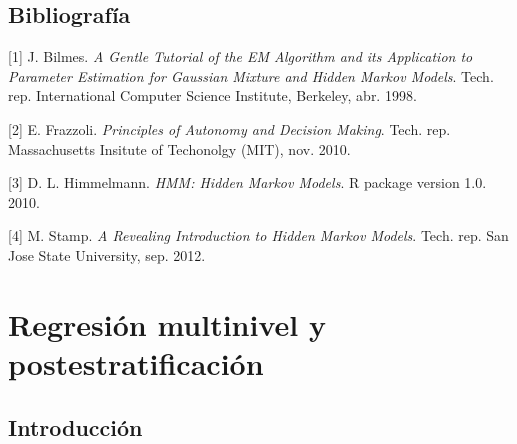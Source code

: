 \documentclass[]{article}
\newenvironment{Shaded}{\begin{snugshade}}{\end{snugshade}}
\newcommand{\KeywordTok}[1]{\textcolor[rgb]{0.13,0.29,0.53}{\textbf{{#1}}}}
\newcommand{\DataTypeTok}[1]{\textcolor[rgb]{0.13,0.29,0.53}{{#1}}}
\newcommand{\DecValTok}[1]{\textcolor[rgb]{0.00,0.00,0.81}{{#1}}}
\newcommand{\StringTok}[1]{\textcolor[rgb]{0.31,0.60,0.02}{{#1}}}
\newcommand{\CommentTok}[1]{\textcolor[rgb]{0.56,0.35,0.01}{\textit{{#1}}}}
\newcommand{\NormalTok}[1]{{#1}}
\begin{document}
\begin{Shaded}
\end{Shaded}

\pagebreak

\subsection{Bibliografía}\label{bibliografia}

{[}1{]} J. Bilmes. \emph{A Gentle Tutorial of the EM Algorithm and its
Application to Parameter Estimation for Gaussian Mixture and Hidden
Markov Models}. Tech. rep. International Computer Science Institute,
Berkeley, abr. 1998.

{[}2{]} E. Frazzoli. \emph{Principles of Autonomy and Decision Making}.
Tech. rep. Massachusetts Insitute of Techonolgy (MIT), nov. 2010.

{[}3{]} D. L. Himmelmann. \emph{HMM: Hidden Markov Models}. R package
version 1.0. 2010.

{[}4{]} M. Stamp. \emph{A Revealing Introduction to Hidden Markov
Models}. Tech. rep. San Jose State University, sep. 2012.

\pagebreak

\section{Regresión multinivel y
postestratificación}\label{regresion-multinivel-y-postestratificacion}

\subsection{Introducción}\label{introduccion-1}
\end{document}
